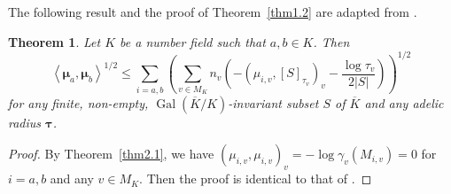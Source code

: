 \documentclass[10pt,a4paper]{amsart}
\numberwithin{equation}{section}
\theoremstyle{plain}
\newtheorem{thm}{Theorem}[section]
\theoremstyle{definition}
\theoremstyle{remark}
\DeclareMathOperator{\Gal}{Gal}
\renewcommand{\bar}{\overline}
\begin{document}
The following result and the proof of Theorem~\ref{thm1.2} are adapted
from \cite[Section 9]{DKY2}.

\begin{thm}\label{thm3.13}
Let $K$ be a number field such that $a,b\in K$.
Then
\[
\left\langle \boldsymbol{\mu}_{a},\boldsymbol{\mu}_{b}\right\rangle ^{1/2}\leq\sum_{i=a,b}\left(\sum_{v\in M_{K}}n_{v}\left(-(\mu_{i,v},[S]_{\tau_{v}})_{v}-\frac{\log\tau_{v}}{2|S|}\right)\right)^{1/2}
\]
for any finite, non-empty, $\Gal(\bar{K}/K)$-invariant subset
$S$ of $\bar{K}$ and any adelic radius $\boldsymbol{\tau}$.
\end{thm}

\begin{proof}
By Theorem~\ref{thm2.1}, we have $(\mu_{i,v},\mu_{i,v})_{v}=-\log\gamma_{v}(M_{i,v})=0$
for $i=a,b$ and any $v\in M_{K}$. Then the proof is identical to
that of \cite[Lemma 9.2]{DKY2}.
\end{proof}
\end{document}

